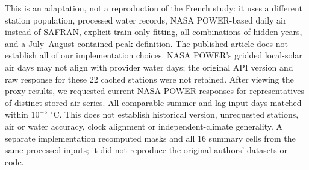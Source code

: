 \begin{table}[ht]\caption{Adapted summer-regression proxy against two distinct nine-year targets. MAE and filled-minus-observed MAE differences are $^{\circ}$C; cases are repeated year masks.}\label{tab:beaufort-proxy}\centering\small
{}\end{table}

This is an adaptation, not a reproduction of the French study: it uses a different station population, processed water records, NASA POWER-based daily air instead of SAFRAN, explicit train-only fitting, all combinations of hidden years, and a July--August-contained peak definition. The published article does not establish all of our implementation choices. NASA POWER's gridded local-solar air days may not align with provider water days; the original API version and raw response for these 22 cached stations were not retained. After viewing the proxy results, we requested current NASA POWER responses for \BFVintageRequests{} representatives of distinct stored air series. All \BFVintageDays{} comparable summer and lag-input days matched within $10^{-5}$ $^{\circ}$C. This does not establish historical version, unrequested stations, air or water accuracy, clock alignment or independent-climate generality. A separate implementation recomputed \BFCases{} masks and all 16 summary cells from the same processed inputs; it did not reproduce the original authors' datasets or code.
